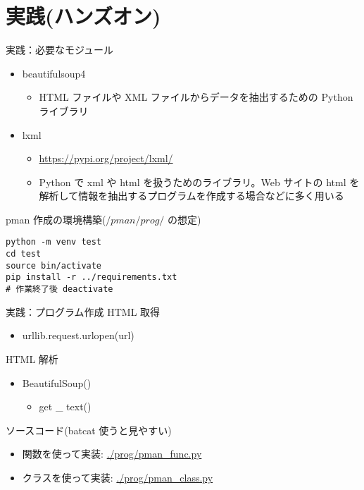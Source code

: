 \documentclass[compress,dvipdfmx,11pt]{beamer}
\begin{document}
\section{実践(ハンズオン)}
\label{sec:org9a061c2}
\begin{frame}[label={sec:org50b368f},fragile]{実践：必要なモジュール}
 \begin{itemize}
\item beautifulsoup4
\begin{itemize}
\item HTML ファイルや XML ファイルからデータを抽出するための Python ライブラリ
\end{itemize}
\item lxml
\begin{itemize}
\item \url{https://pypi.org/project/lxml/}
\item Python で xml や html を扱うためのライブラリ。Web サイトの html を
解析して情報を抽出するプログラムを作成する場合などに多く用いる
\end{itemize}
\end{itemize}

pman 作成の環境構築(\(/pman/prog/\) の想定)
\begin{verbatim}
python -m venv test
cd test
source bin/activate
pip install -r ../requirements.txt
# 作業終了後 deactivate
\end{verbatim}
\end{frame}

\begin{frame}[label={sec:org62f8f3b}]{実践：プログラム作成}
HTML 取得
\begin{itemize}
\item urllib.request.urlopen(url)
\end{itemize}

HTML 解析
\begin{itemize}
\item BeautifulSoup()
\begin{itemize}
\item get \_ text()
\end{itemize}
\end{itemize}

ソースコード(\alert{batcat} 使うと見やすい)
\begin{itemize}
\item 関数を使って実装:  \url{./prog/pman\_func.py}
\item クラスを使って実装: \url{./prog/pman\_class.py}
\end{itemize}
\end{frame}
\end{document}
